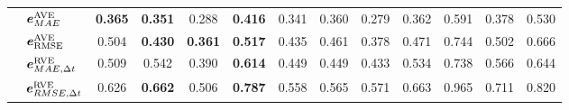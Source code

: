 \begin{frame}
{\begin{tabular*}{\linewidth}{@{\extracolsep{\fill}}clccccccccccc}
			& $\vb*{e}^{\mathrm{AVE}}_{MAE}$ 
			& \textbf{0.365} & \textbf{0.351} & 0.288 & \textbf{0.416} & 0.341 & 0.360 & 0.279 & 0.362 & 0.591 & 0.378 & 0.530 \\
			& $\vb*{e}^{\mathrm{AVE}}_{\mathrm{RMSE}}$          
			& 0.504 & \textbf{0.430} & \textbf{0.361} & \textbf{0.517} & 0.435 & 0.461 & 0.378 & 0.471 & 0.744 & 0.502 & 0.666 \\
			& $\vb*{e}^{\mathrm{RVE}}_{MAE, \Delta t}$ 
			& 0.509 & 0.542 & 0.390 & \textbf{0.614} & 0.449 & 0.449 & 0.433 & 0.534 & 0.738 & 0.566 & 0.644 \\ 
			& $\vb*{e}^{\mathrm{RVE}}_{RMSE,\Delta t}$ 
			& 0.626 & \textbf{0.662} & 0.506 & \textbf{0.787} & 0.558 & 0.565 & 0.571 & 0.663 & 0.965 & 0.711 & 0.820 \\
			\bottomrule 
		\end{tabular*}
	}	
\end{frame}

